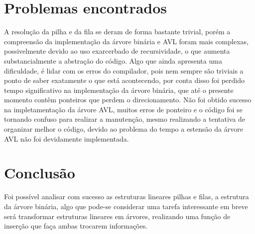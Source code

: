 \documentclass[11pt]{article}
\begin{document}
\section{Problemas encontrados}
A resolução da pilha e da fila se deram de forma bastante trivial, porém a compreensão da implementação da árvore binária e AVL foram mais complexas, possivelmente devido ao uso exarcerbado de recursividade, o que aumenta substancialmente a abstração do código. Algo que ainda apresenta uma dificuldade, é lidar com os erros do compilador, pois nem sempre são triviais a ponto de saber exatamente o que está acontecendo, por conta disso foi perdido tempo significativo na implementação da árvore binária, que até o presente momento contêm ponteiros que perdem o direcionamento.
Não foi obtido sucesso na impletamentação da árvore AVL, muitos erros de ponteiro e o código foi se tornando confuso para realizar a manutenção, mesmo realizando a tentativa de organizar melhor o código, devido ao problema do tempo a estensão da árvore AVL não foi devidamente implementada.

\section{Conclusão}

Foi possível analisar com sucesso as estruturas lineares pilhas e filas, a estrutura da árvore binária, algo que pode-se considerar uma tarefa interessante em breve será transformar estruturas lineares em árvores, realizando uma função de inserção que faça ambas trocarem informações. 
\end{document}
